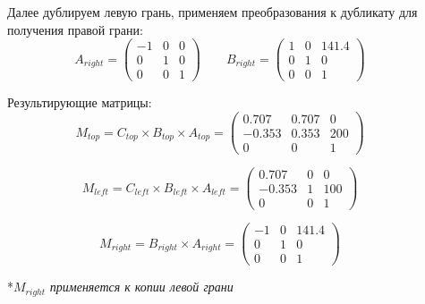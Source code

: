 Далее дублируем левую грань, 
применяем преобразования к дубликату для получения правой грани:
\begin{equation*}
    A_{right} = 
    \begin{pmatrix}
         -1& 0& 0\\ 
         0& 1& 0\\ 
         0&  0& 1
    \end{pmatrix} \hspace{24pt}
    B_{right} = 
    \begin{pmatrix} 
        1& 0& 141.4\\
        0& 1& 0\\
        0& 0& 1
    \end{pmatrix} \hspace{24pt}
\end{equation*}

Результирующие матрицы:
\begin{equation*}
    M_{top} = C_{top}\times B_{top}\times A_{top} = 
    \begin{pmatrix} 
        0.707& 0.707& 0\\
        -0.353& 0.353& 200\\
        0& 0& 1
    \end{pmatrix} \hspace{24pt}
\end{equation*}

\begin{equation*}
    M_{left} = C_{left}\times B_{left}\times A_{left} = 
    \begin{pmatrix} 
        0.707& 0& 0\\
        -0.353& 1& 100\\
        0& 0& 1
    \end{pmatrix} \hspace{24pt}
\end{equation*}

\begin{equation*}
    M_{right} = B_{right}\times A_{right} = 
    \begin{pmatrix} 
        -1& 0& 141.4\\
        0& 1& 0\\
        0& 0& 1
    \end{pmatrix} \hspace{24pt}
\end{equation*}

*$M_{right}$ \textit{ применяется к копии левой грани}


